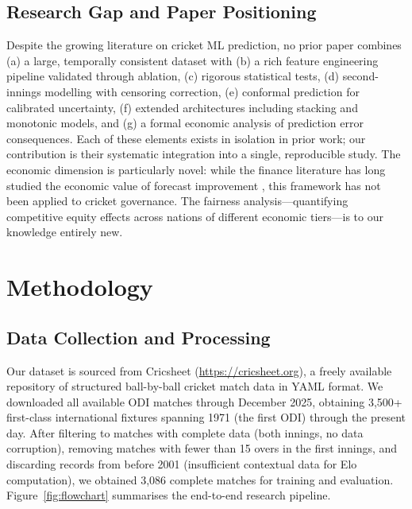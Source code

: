 \documentclass[10pt,a4paper,twocolumn]{article}
\begin{document}
\subsection{Research Gap and Paper Positioning}

Despite the growing literature on cricket ML prediction, no prior paper combines (a) a large, temporally consistent dataset with (b) a rich feature engineering pipeline validated through ablation, (c) rigorous statistical tests, (d) second-innings modelling with censoring correction, (e) conformal prediction for calibrated uncertainty, (f) extended architectures including stacking and monotonic models, and (g) a formal economic analysis of prediction error consequences. Each of these elements exists in isolation in prior work; our contribution is their systematic integration into a single, reproducible study. The economic dimension is particularly novel: while the finance literature has long studied the economic value of forecast improvement \citep{Howard1966}, this framework has not been applied to cricket governance. The fairness analysis---quantifying competitive equity effects across nations of different economic tiers---is to our knowledge entirely new.

\section{Methodology}
\label{sec:method}

\subsection{Data Collection and Processing}

Our dataset is sourced from Cricsheet (\url{https://cricsheet.org}), a freely available repository of structured ball-by-ball cricket match data in YAML format. We downloaded all available ODI matches through December 2025, obtaining 3,500+ first-class international fixtures spanning 1971 (the first ODI) through the present day. After filtering to matches with complete data (both innings, no data corruption), removing matches with fewer than 15 overs in the first innings, and discarding records from before 2001 (insufficient contextual data for Elo computation), we obtained 3,086 complete matches for training and evaluation. Figure~\ref{fig:flowchart} summarises the end-to-end research pipeline.
\end{document}
